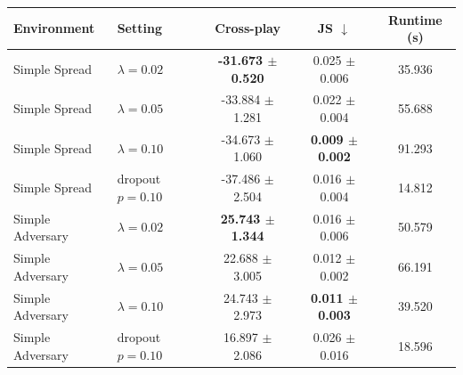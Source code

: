 \begin{tabular}{llccc}
\toprule
Environment & Setting & Cross-play & JS $\downarrow$ & Runtime (s) \\
\midrule
Simple Spread & $\lambda=0.02$ & \textbf{-31.673 $\pm$ 0.520} & 0.025 $\pm$ 0.006 & 35.936 \\
Simple Spread & $\lambda=0.05$ & -33.884 $\pm$ 1.281 & 0.022 $\pm$ 0.004 & 55.688 \\
Simple Spread & $\lambda=0.10$ & -34.673 $\pm$ 1.060 & \textbf{0.009 $\pm$ 0.002} & 91.293 \\
Simple Spread & dropout $p=0.10$ & -37.486 $\pm$ 2.504 & 0.016 $\pm$ 0.004 & 14.812 \\
\midrule
Simple Adversary & $\lambda=0.02$ & \textbf{25.743 $\pm$ 1.344} & 0.016 $\pm$ 0.006 & 50.579 \\
Simple Adversary & $\lambda=0.05$ & 22.688 $\pm$ 3.005 & 0.012 $\pm$ 0.002 & 66.191 \\
Simple Adversary & $\lambda=0.10$ & 24.743 $\pm$ 2.973 & \textbf{0.011 $\pm$ 0.003} & 39.520 \\
Simple Adversary & dropout $p=0.10$ & 16.897 $\pm$ 2.086 & 0.026 $\pm$ 0.016 & 18.596 \\
\bottomrule
\end{tabular}
